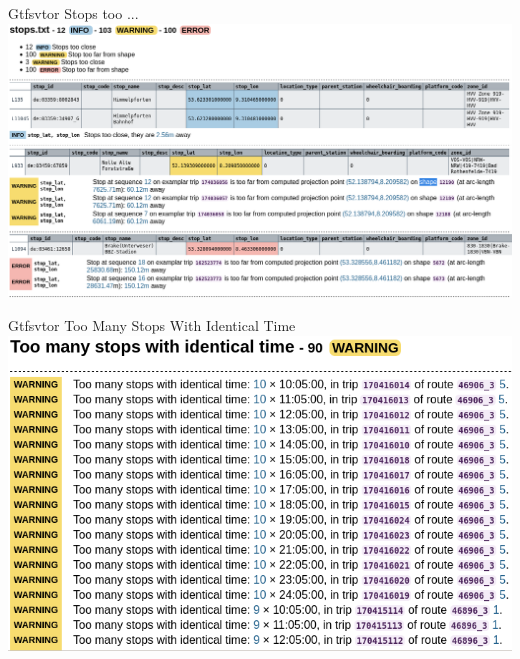 \begin{frame}{Gtfsvtor Stops too ...}
\includegraphics[width=0.95\paperwidth]{gtfs-validation/gtfsvtor-report-vbn-top-dhid-stops-too.png}
\end{frame}

\begin{frame}{Gtfsvtor Too Many Stops With Identical Time}
\includegraphics[width=0.9\paperwidth]{gtfs-validation/gtfsvtor-report-vbn-top-dhid-identical-time.png}
\end{frame}
